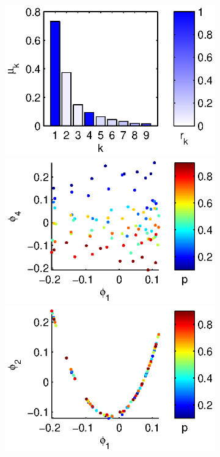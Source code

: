 \documentclass[preprint]{elsarticle}
\begin{document}
\begin{figure}
\begin{subfigure}[t]{0.31\textwidth}
\caption{}
\end{subfigure}
%
\begin{subfigure}[t]{0.35\textwidth}
\centering
\includegraphics[height=\figheight]{chemotaxis3_evals}
\includegraphics[height=\figheight]{chemotaxis3_embed_good}
\includegraphics[height=\figheight]{chemotaxis3_embed_bad}

\end{subfigure}
\end{figure}
\end{document}

